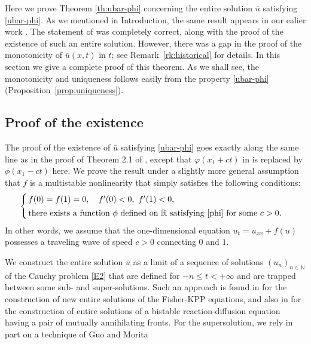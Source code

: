 \documentclass[a4paper,12pt,fullpage]{article}
\numberwithin{equation}{section}
\def\R{{\mathbb R}}
\def\N{{\mathbb N}}
\begin{document}
Here we prove Theorem \ref{th:ubar-phi} concerning the entire solution $\bar{u}$ satisfying \eqref{ubar-phi}. As we mentioned in Introduction, the same result appears in our ealier work \cite[Theorem 2.1]{BHM1}. The statement of \cite[Theorem 2.1]{BHM1} was completely correct, along with the proof of the existence of such an entire solution. However, there was a gap in the proof of the monotonicity of $\overline{u}(x,t)$ in $t$; see Remark~\ref{rk:historical} for details. In this section we give a complete proof of this theorem.  As we shall see, the monotonicity and uniqueness follows easily from the property \eqref{ubar-phi} (Proposition~\ref{prop:uniqueness}).


\subsection{Proof of the existence}\label{ss:existence}

The proof of the existence of $\bar{u}$ satisfying \eqref{ubar-phi} goes exactly along the same line as in the proof of Theorem 2.1 of \cite{BHM1}, except that $\varphi(x_1+ct)$ in \cite{BHM1} is replaced by $\phi(x_1-ct)$ here.  We prove the result under a slightly more general assumption that $f$ is a multistable nonlinearity that simply satisfies the following conditions:
\begin{equation}\label{f-multi}
\begin{cases}
\, f(0)=f(1)=0,\quad f'(0)<0,\ f'(1)<0,\\[2pt]
\, \hbox{there exists a function $\phi$ defined on $\R$ satisfying \eqref{phi} for some $c>0$.}
\end{cases}
\end{equation}
In other words, we assume that the one-dimensional equation $u_t=u_{xx}+f(u)$ possesses a traveling wave of speed $c>0$ connecting $0$ and $1$.

We construct the entire solution $\bar{u}$ as a limit of a sequence of solutions $(u_n)_{n\in\N}$ of the Cauchy problem \eqref{E2} that are defined for $-n\leq t<+\infty$ and are trapped between some sub- and super-solutions. Such an approach is found in \cite{HN1,HN2} for the construction of  new entire solutions of the Fisher-KPP equations, and also in \cite{FMN, GM} for the construction of entire solutions of a bistable reaction-diffusion equation having a pair of mutually annihilating fronts. For the supersolution, we rely in part on a technique of Guo and Morita \cite{GM}
\end{document}
